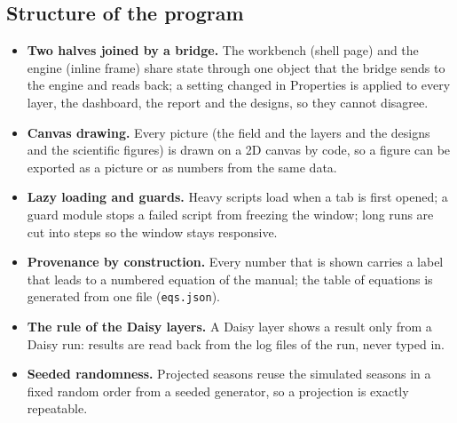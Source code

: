 \subsection{Structure of the program}
\begin{itemize}[nosep,leftmargin=1.2em]
\item \textbf{Two halves joined by a bridge.} The workbench (shell page) and the engine (inline frame) share state through one object that the bridge sends to the engine and reads back; a setting changed in Properties is applied to every layer, the dashboard, the report and the designs, so they cannot disagree.
\item \textbf{Canvas drawing.} Every picture (the field and the layers and the designs and the scientific figures) is drawn on a 2D canvas by code, so a figure can be exported as a picture or as numbers from the same data.
\item \textbf{Lazy loading and guards.} Heavy scripts load when a tab is first opened; a guard module stops a failed script from freezing the window; long runs are cut into steps so the window stays responsive.
\item \textbf{Provenance by construction.} Every number that is shown carries a label that leads to a numbered equation of the manual; the table of equations is generated from one file (\texttt{eqs.json}).
\item \textbf{The rule of the Daisy layers.} A Daisy layer shows a result only from a Daisy run: results are read back from the log files of the run, never typed in.
\item \textbf{Seeded randomness.} Projected seasons reuse the simulated seasons in a fixed random order from a seeded generator, so a projection is exactly repeatable.
\end{itemize}
